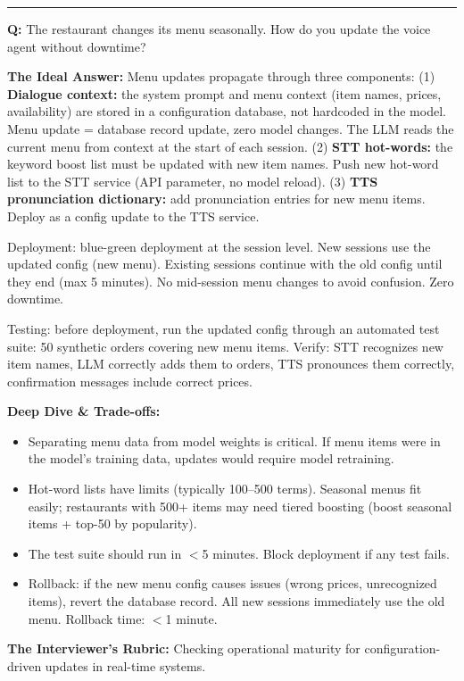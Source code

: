 \bigskip\hrule\bigskip

\textbf{Q:} The restaurant changes its menu seasonally. How do you update the voice agent without downtime?

\textbf{The Ideal Answer:} Menu updates propagate through three components: (1) \textbf{Dialogue context:} the system prompt and menu context (item names, prices, availability) are stored in a configuration database, not hardcoded in the model. Menu update = database record update, zero model changes. The LLM reads the current menu from context at the start of each session. (2) \textbf{STT hot-words:} the keyword boost list must be updated with new item names. Push new hot-word list to the STT service (API parameter, no model reload). (3) \textbf{TTS pronunciation dictionary:} add pronunciation entries for new menu items. Deploy as a config update to the TTS service.

Deployment: blue-green deployment at the session level. New sessions use the updated config (new menu). Existing sessions continue with the old config until they end (max 5 minutes). No mid-session menu changes to avoid confusion. Zero downtime.

Testing: before deployment, run the updated config through an automated test suite: 50 synthetic orders covering new menu items. Verify: STT recognizes new item names, LLM correctly adds them to orders, TTS pronounces them correctly, confirmation messages include correct prices.

\textbf{Deep Dive \& Trade-offs:}
\begin{itemize}
  \item Separating menu data from model weights is critical. If menu items were in the model's training data, updates would require model retraining.
  \item Hot-word lists have limits (typically 100--500 terms). Seasonal menus fit easily; restaurants with 500+ items may need tiered boosting (boost seasonal items + top-50 by popularity).
  \item The test suite should run in $<$5 minutes. Block deployment if any test fails.
  \item Rollback: if the new menu config causes issues (wrong prices, unrecognized items), revert the database record. All new sessions immediately use the old menu. Rollback time: $<$1 minute.
\end{itemize}

\textbf{The Interviewer's Rubric:} Checking operational maturity for configuration-driven updates in real-time systems.

